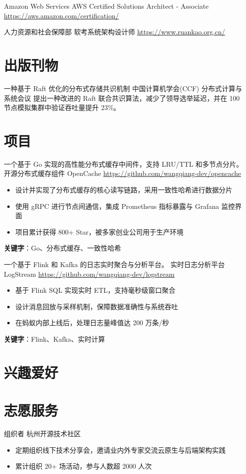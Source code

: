 \documentclass[a4paper, serif, 10pt]{moderncv}
\begin{document}
        {Amazon Web Services}
        {AWS Certified Solutions Architect - Associate}
        {\url{https://aws.amazon.com/certification/}}
        {}
        {}

        {人力资源和社会保障部}
        {软考系统架构设计师}
        {\url{https://www.ruankao.org.cn/}}
        {}
        {}
\section{出版刊物}

        {一种基于 Raft 优化的分布式存储共识机制}
        {中国计算机学会(CCF) 分布式计算与系统会议}
        {}
        {}
        {提出一种改进的 Raft 联合共识算法，减少了领导选举延迟，并在 100 节点模拟集群中验证吞吐量提升 23\%。}
\section{项目}

        {一个基于 Go 实现的高性能分布式缓存中间件，支持 LRU/TTL 和多节点分片。}
        {开源分布式缓存组件 OpenCache}
        {\url{https://github.com/wangqiang-dev/opencache}}
        {}
        {\begin{itemize}
\item 设计并实现了分布式缓存的核心读写链路，采用一致性哈希进行数据分片
\item 使用 gRPC 进行节点间通信，集成 Prometheus 指标暴露与 Grafana 监控界面
\item 项目累计获得 800+ Star，被多家创业公司用于生产环境
\end{itemize}
\textbf{关键字}：Go、分布式缓存、一致性哈希}

        {一个基于 Flink 和 Kafka 的日志实时聚合与分析平台。}
        {实时日志分析平台 LogStream}
        {\url{https://github.com/wangqiang-dev/logstream}}
        {}
        {\begin{itemize}
\item 基于 Flink SQL 实现实时 ETL，支持毫秒级窗口聚合
\item 设计消息回放与采样机制，保障数据准确性与系统吞吐
\item 在蚂蚁内部上线后，处理日志量峰值达 200 万条/秒
\end{itemize}
\textbf{关键字}：Flink、Kafka、实时计算}
\section{兴趣爱好}

\section{志愿服务}

        {组织者}
        {杭州开源技术社区}
        {}
        {}
        {\begin{itemize}
\item 定期组织线下技术分享会，邀请业内外专家交流云原生与后端架构实践
\item 累计组织 20+ 场活动，参与人数超 2000 人次
\end{itemize}}
\end{document}
